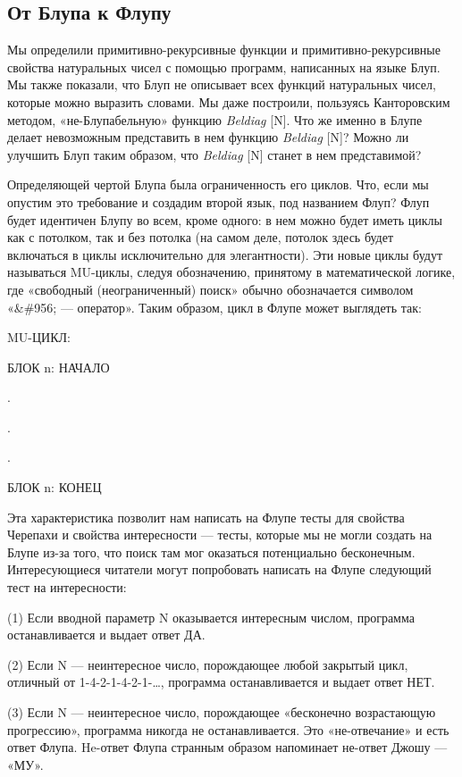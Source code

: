 \documentclass[../main.tex]{subfiles}
\begin{document}
\subsection{От Блупа к Флупу}

Мы определили примитивно-рекурсивные функции и примитивно-рекурсивные свойства натуральных чисел с помощью программ, написанных на языке Блуп. Мы также показали, что Блуп не описывает всех функций натуральных чисел, которые можно выразить словами. Мы даже построили, пользуясь Канторовским методом, «не-Блупабельную» функцию \emph{Beldiag} {[}N{]}. Что же именно в Блупе делает невозможным представить в нем функцию \emph{Beldiag} {[}N{]}? Можно ли улучшить Блуп таким образом, что \emph{Beldiag} {[}N{]} станет в нем представимой?

Определяющей чертой Блупа была ограниченность его циклов. Что, если мы опустим это требование и создадим второй язык, под названием Флуп? Флуп будет идентичен Блупу во всем, кроме одного: в нем можно будет иметь циклы как с потолком, так и без потолка (на самом деле, потолок здесь будет включаться в циклы исключительно для элегантности). Эти новые циклы будут называться MU-циклы, следуя обозначению, принятому в математической логике, где «свободный (неограниченный) поиск» обычно обозначается символом «\&\#956; --- оператор». Таким образом, цикл в Флупе может выглядеть так:

MU-ЦИКЛ:

БЛОК n: НАЧАЛО

.

.

.~

БЛОК n: КОНЕЦ

Эта характеристика позволит нам написать на Флупе тесты для свойства Черепахи и свойства интересности --- тесты, которые мы не могли создать на Блупе из-за того, что поиск там мог оказаться потенциально бесконечным. Интересующиеся читатели могут попробовать написать на Флупе следующий тест на интересности:

(1) Если вводной параметр N оказывается интересным числом, программа останавливается и выдает ответ ДА.

(2) Если N --- неинтересное число, порождающее любой закрытый цикл, отличный от 1-4-2-1-4-2-1-\ldots, программа останавливается и выдает ответ НЕТ.

(3) Если N --- неинтересное число, порождающее «бесконечно возрастающую прогрессию», программа никогда не останавливается. Это «не-отвечание» и есть ответ Флупа. He-ответ Флупа странным образом напоминает не-ответ Джошу --- «МУ».
\end{document}
